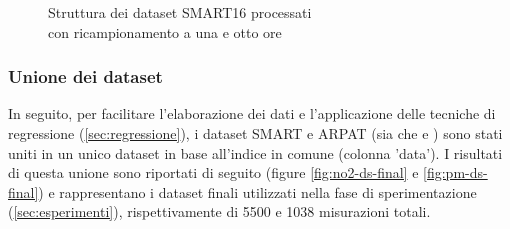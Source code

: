 \begin{figure}[H]%
    \centering
    \captionsetup{justification=centering}
    \caption{Struttura dei dataset SMART16 processati\\con ricampionamento a una e otto ore}%
    \label{fig:ris-prepro}%
\end{figure}

\subsubsection{Unione dei dataset}
In seguito, per facilitare l'elaborazione dei dati e l'applicazione delle tecniche di regressione (\ref{sec:regressione}), i dataset SMART e ARPAT (sia  che  e ) sono stati uniti in un unico dataset in base all'indice in comune (colonna 'data').
I risultati di questa unione sono riportati di seguito (figure \ref{fig:no2-ds-final} e \ref{fig:pm-ds-final}) e rappresentano i dataset finali utilizzati nella fase di sperimentazione (\ref{sec:esperimenti}), rispettivamente di 5500 e 1038 misurazioni totali.

